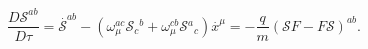 \begin{equation}
\frac{D\mathcal{S}^{ab}}{D\tau }=\stackrel{.}{\mathcal{S}}^{ab}-\left(
\omega _{\mu }^{ac}\mathcal{S}_{c}{}^{b}+\omega _{\mu }^{cb}\mathcal{S}%
{}^{a}{}_{c}\right) \stackrel{.}{x}^{\mu }=-\frac{q}{m}\left( \mathcal{S}F-F%
\mathcal{S}\right) ^{ab}.  \label{temps S}
\end{equation}

